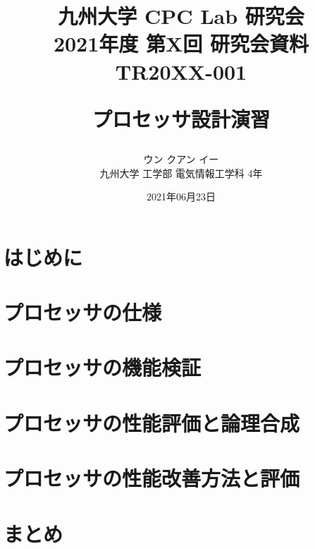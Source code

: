 \documentclass[a4paper, 10pt]{jarticle}
\title{
  \begin{flushright}
    \normalsize{
      九州大学 CPC Lab 研究会  \\
      2021年度 第X回 研究会資料 TR20XX-001
    }
  \end{flushright}
  \Large{\textbf{プロセッサ設計演習}}
}
\author{
    ウン クアン イー\\
    九州大学 工学部 電気情報工学科 4年
}
\date{2021年06月23日}
\begin{document}
  \begin{twocolumn}

  \maketitle

  \section{はじめに}
  

  \section{プロセッサの仕様}
  

  \section{プロセッサの機能検証}
  

  \section{プロセッサの性能評価と論理合成}
  

  \section{プロセッサの性能改善方法と評価}
  

  \section{まとめ}
  

  \cite{riscv-reader}
  \cite{ca-quantitative-approach}

  
  

\end{twocolumn}
\end{document}
